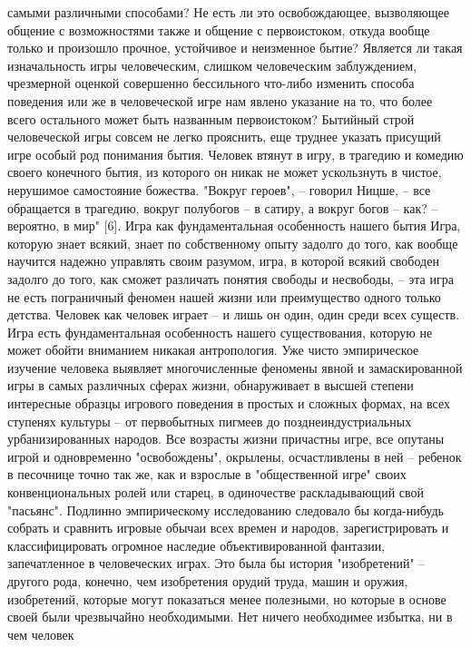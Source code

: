 \documentclass[12pt]{article}
\begin{document}
самыми различными способами? Не есть ли это освобождающее, вызволяющее общение с возможностями
также и общение с первоистоком, откуда вообще только и произошло прочное, устойчивое и неизменное бытие?
Является  ли  такая  изначальность  игры  человеческим,  слишком  человеческим  заблуждением,  чрезмерной
оценкой совершенно бессильного что-либо изменить способа поведения или же в человеческой игре нам явлено
указание  на  то,  что  более  всего  остального  может  быть  названным  первоистоком?  Бытийный  строй
человеческой игры совсем не легко прояснить, еще труднее указать присущий игре особый род понимания
бытия. Человек втянут в игру, в трагедию и комедию своего конечного бытия, из которого он никак не может
ускользнуть в чистое, нерушимое самостояние божества. "Вокруг героев", -- говорил Ницше, -- все обращается
в трагедию, вокруг полубогов -- в сатиру, а вокруг богов -- как? -- вероятно, в мир" [6].
Игра как фундаментальная особенность нашего бытия
Игра, которую знает всякий, знает по собственному опыту задолго до того, как вообще научится надежно
управлять своим разумом, игра, в которой всякий свободен задолго до того, как сможет различать понятия
свободы и несвободы, -- эта игра не есть пограничный феномен нашей жизни или преимущество одного только
детства. Человек как человек играет -- и лишь он один, один среди всех существ. Игра есть фундаментальная
особенность нашего существования, которую не может обойти вниманием никакая антропология. Уже чисто
эмпирическое изучение человека выявляет многочисленные феномены явной и замаскированной игры в самых 
различных сферах жизни, обнаруживает в высшей степени интересные образцы игрового поведения в простых
и  сложных  формах,  на  всех  ступенях  культуры  --  от  первобытных  пигмеев  до  позднеиндустриальных
урбанизированных  народов.  Все  возрасты  жизни  причастны  игре,  все  опутаны  игрой  и  одновременно
"освобождены",  окрылены,  осчастливлены  в  ней  --  ребенок  в  песочнице  точно  так  же,  как  и  взрослые  в
"общественной  игре"  своих  конвенциональных  ролей  или  старец,  в  одиночестве  раскладывающий  свой
"пасьянс". Подлинно эмпирическому исследованию следовало бы когда-нибудь собрать и сравнить игровые
обычаи всех времен и народов, зарегистрировать и классифицировать огромное наследие объективированной
фантазии, запечатленное в человеческих играх. Это была бы история "изобретений" -- другого рода, конечно,
чем изобретения орудий труда, машин и оружия, изобретений, которые могут показаться менее полезными, но
которые в основе своей были чрезвычайно необходимыми. Нет ничего необходимее избытка, ни в чем человек
\end{document}

